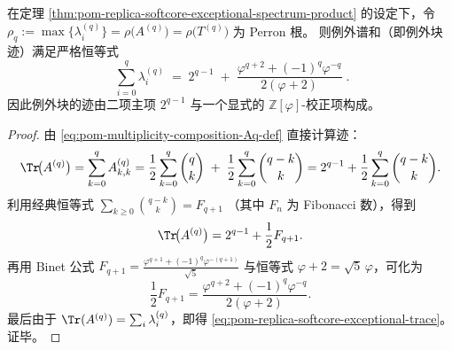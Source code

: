 \begin{theorem}\label{thm:pom-replica-softcore-exceptional-spectrum-trace}
在定理 \ref{thm:pom-replica-softcore-exceptional-spectrum-product} 的设定下，令
\(
\rho_q:=\max\{\lambda_i^{(q)}\}
=\rho\!\bigl(A^{(q)}\bigr)=\rho\!\bigl(T^{(q)}\bigr)
\)
为 Perron 根。
则例外谱和（即例外块迹）满足严格恒等式
\begin{equation}\label{eq:pom-replica-softcore-exceptional-trace}
\boxed{\;
\sum_{i=0}^{q}\lambda_i^{(q)}
\;=\;
2^{q-1}
\;+\;
\frac{\varphi^{q+2}+(-1)^q\varphi^{-q}}{2(\varphi+2)}\; } .
\end{equation}
因此例外块的迹由二项主项 \(2^{q-1}\) 与一个显式的 \(\mathbb Z[\varphi]\)-校正项构成。
\end{theorem}
\begin{proof}
由 \eqref{eq:pom-multiplicity-composition-Aq-def} 直接计算迹：
\[
\Tr\!\bigl(A^{(q)}\bigr)
=\sum_{k=0}^{q}A^{(q)}_{k,k}
=\frac12\sum_{k=0}^{q}\binom{q}{k}
\;+\;\frac12\sum_{k=0}^{q}\binom{q-k}{k}
=2^{q-1}+\frac12\sum_{k=0}^{q}\binom{q-k}{k}.
\]
利用经典恒等式
\(
\sum_{k\ge 0}\binom{q-k}{k}=F_{q+1}
\)
（其中 \(F_n\) 为 Fibonacci 数），得到
\[
\Tr\!\bigl(A^{(q)}\bigr)=2^{q-1}+\frac12F_{q+1}.
\]
再用 Binet 公式 \(F_{q+1}=\frac{\varphi^{q+1}+(-1)^q\varphi^{-(q+1)}}{\sqrt5}\)
与恒等式 \(\varphi+2=\sqrt5\,\varphi\)，可化为
\[
\frac12F_{q+1}
=\frac{\varphi^{q+2}+(-1)^q\varphi^{-q}}{2(\varphi+2)}.
\]
最后由于 \(\Tr(A^{(q)})=\sum_i\lambda_i^{(q)}\)，即得 \eqref{eq:pom-replica-softcore-exceptional-trace}。证毕。
\end{proof}



